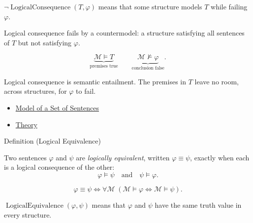 \begin{remark*}
\(\neg\operatorname{LogicalConsequence}(T,\varphi)\) means that some structure
models \(T\) while failing \(\varphi\).
\end{remark*}

\begin{remark*}
Logical consequence fails by a countermodel: a structure satisfying all
sentences of \(T\) but not satisfying \(\varphi\).
\end{remark*}

\begin{remark*}
\[
\underbrace{\mathcal M\models T}_{\text{premises true}}
\qquad
\underbrace{\mathcal M\not\models\varphi}_{\text{conclusion false}}.
\]
\end{remark*}

\begin{remark*}[Interpretation]
Logical consequence is semantic entailment. The premises in \(T\) leave no
room, across structures, for \(\varphi\) to fail.
\end{remark*}

\begin{dependencies}
\begin{itemize}
  \item \hyperref[def:model-theory-set]{Model of a Set of Sentences}
  \item \hyperref[def:theory]{Theory}
\end{itemize}
\end{dependencies}

\begin{definitionbox}{Definition (Logical Equivalence)}
\begin{definition}
\label{def:log-equiv}
Two sentences \(\varphi\) and \(\psi\) are \emph{logically equivalent}, written
\(\varphi\equiv\psi\), exactly when each is a logical consequence of the other:
\[
\varphi\models\psi
\quad\text{and}\quad
\psi\models\varphi.
\]
\end{definition}
\end{definitionbox}

\begin{remark*}
\[
\varphi\equiv\psi
\Longleftrightarrow
\forall \mathcal M\;(\mathcal M\models\varphi \Longleftrightarrow \mathcal M\models\psi).
\]
\end{remark*}

\begin{remark*}
\(\operatorname{LogicalEquivalence}(\varphi,\psi)\) means that \(\varphi\) and
\(\psi\) have the same truth value in every structure.
\end{remark*}

